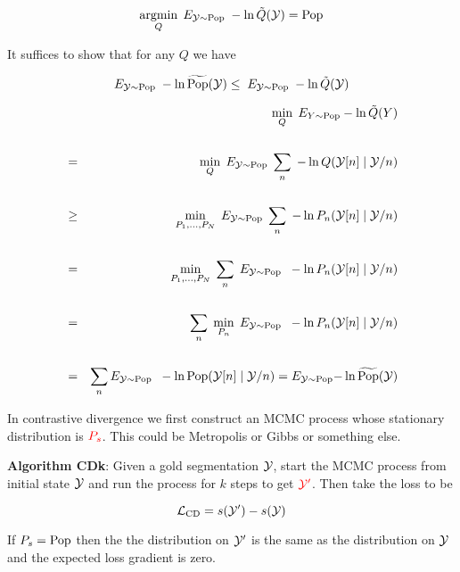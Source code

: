 {

{\color{red} $$\operatorname*{argmin}_Q \; E_{{\cal Y} \sim \mathrm{Pop}} \;-\ln \tilde{Q}({\cal Y}) = \mathrm{Pop}$$}

\vfill
It suffices to show that for any $Q$ we have

\vfill
$$ E_{{\cal Y} \sim \mathrm{Pop}}\;-\ln \widetilde{\mathrm{Pop}}({\cal Y}) \leq \;E_{{\cal Y} \sim \mathrm{Pop}}\;-\ln \tilde{Q}({\cal Y})$$


{\huge
\begin{eqnarray*}
  & & \min_Q \;E_{Y\sim \mathrm{Pop}} -\ln \tilde{Q}(Y) \\
  \\
  & = & \min_Q \;E_{{\cal Y}\sim \mathrm{Pop}} \;\sum_n\;-\ln Q({\cal Y}[n]\;|\;{\cal Y}/n) \\
  \\
  & \geq & \min_{P_1,\ldots,P_N} \;E_{{\cal Y}\sim \mathrm{Pop}} \;\sum_n\;-\ln P_n({\cal Y}[n]\;|\;{\cal Y}/n) \\
  \\
  & = & \min_{P_1,\ldots,P_N} \;\sum_n \;E_{{\cal Y} \sim \mathrm{Pop}}\;\; -\ln P_n({\cal Y}[n]\;|\;{\cal Y}/n) \\
  \\          
  & = & \sum_n \;\min_{P_n}\;E_{{\cal Y} \sim \mathrm{Pop}}\;\; -\ln P_n({\cal Y}[n]\;|\;{\cal Y}/n) \\
  \\
    & = & \sum_n E_{{\cal Y} \sim \mathrm{Pop}}\;\; -\ln \mathrm{Pop}({\cal Y}[n]\;|\;{\cal Y}/n) =  E_{{\cal Y} \sim \mathrm{Pop}}{-\ln \widetilde{\mathrm{Pop}}({\cal Y})}
\end{eqnarray*}
}


In contrastive divergence we first construct an MCMC process whose stationary distribution is ${\color{red} P_s}$.  This could be
Metropolis or Gibbs or something else.

\vfill
{\bf Algorithm CDk}: Given a gold segmentation ${\cal Y}$, start the MCMC process from initial state ${\cal Y}$ and run the process for $k$ steps
to get ${\color{red} {\cal Y}'}$.  Then take the loss to be

\vfill
{\color{red} $${\cal L}_{\mathrm{CD}}  = s({\cal Y}') - s({\cal Y})$$}

If $P_s = \mathrm{Pop}$ then the the distribution on ${\cal Y}'$ is the same as the distribution on ${\cal Y}$ and the
expected loss gradient is zero.


}
